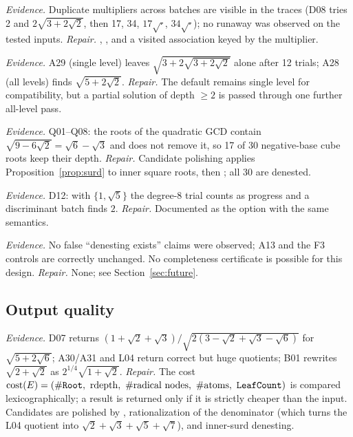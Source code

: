 \emph{Evidence.} Duplicate multipliers across batches are visible in the traces
(D08 tries 2 and $2\sqrt{3+2\sqrt2}$, then 17, 34, $17\sqrt{\cdot}$, $34\sqrt{\cdot}$);
no runaway was observed on the tested inputs. \emph{Repair.} ,
, and a visited association keyed by the multiplier.

\emph{Evidence.} A29 (single level) leaves $\sqrt{3+2\sqrt{3+2\sqrt2}}$ alone
after 12 trials; A28 (all levels) finds $\sqrt{5+2\sqrt2}$. \emph{Repair.} The
default remains single level for compatibility, but a partial solution of
depth $\ge2$ is passed through one further all-level pass.

\emph{Evidence.} Q01--Q08: the roots of the quadratic GCD contain
$\sqrt{9-6\sqrt2}=\sqrt6-\sqrt3$ and  does not remove it, so 17
of 30 negative-base cube roots keep their depth. \emph{Repair.} Candidate
polishing applies Proposition~\ref{prop:surd} to inner square roots, then
; all 30 are denested.

\emph{Evidence.} D12: with $\{1,\sqrt5\}$ the degree-8 trial counts as progress
and a discriminant batch finds $2$. \emph{Repair.} Documented as the
 option with the same semantics.

\emph{Evidence.} No false ``denesting exists'' claims were observed; A13 and
the F3 controls are correctly unchanged. No completeness certificate is
possible for this design. \emph{Repair.} None; see Section~\ref{sec:future}.

\subsection{Output quality}

\emph{Evidence.} D07 returns $(1+\sqrt2+\sqrt3)/\sqrt{2(3-\sqrt2+\sqrt3-\sqrt6)}$
for $\sqrt{5+2\sqrt6}$; A30/A31 and L04 return correct but huge quotients;
B01 rewrites $\sqrt{2+\sqrt2}$ as $2^{1/4}\sqrt{1+\sqrt2}$. \emph{Repair.} The
cost $\cost(E)=(\#\code{Root},\ \rdepth,\ \#\text{radical nodes},\ \#\text{atoms},\ \code{LeafCount})$
is compared lexicographically; a result is returned only if it is strictly
cheaper than the input. Candidates are polished by ,
rationalization of the denominator (which turns the L04 quotient into
$\sqrt2+\sqrt3+\sqrt5+\sqrt7$), and inner-surd denesting.

